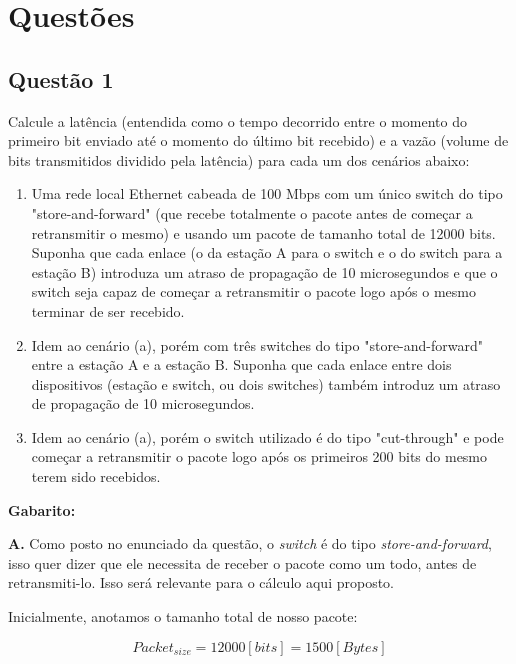 \section{Questões}\label{sec:questoes}


\subsection{Questão 1}

Calcule a latência (entendida como o tempo decorrido entre o momento do primeiro
bit enviado até o momento do último bit recebido) e a vazão (volume de bits
transmitidos dividido pela latência) para cada um dos cenários abaixo:

\begin{enumerate}
    \item Uma rede local Ethernet cabeada de 100 Mbps com um único switch do tipo
    "store-and-forward" (que recebe totalmente o pacote antes de começar a
    retransmitir o mesmo) e usando um pacote de tamanho total de 12000 bits. Suponha
    que cada enlace (o da estação A para o switch e o do switch para a estação B)
    introduza um atraso de propagação de 10 microsegundos e que o switch seja capaz
    de começar a retransmitir o pacote logo após o mesmo terminar de ser recebido.

    \item Idem ao cenário (a), porém com três switches do tipo "store-and-forward" entre
    a estação A e a estação B. Suponha que cada enlace entre dois dispositivos (estação
    e switch, ou dois switches) também introduz um atraso de propagação de 10
    microsegundos.

    \item Idem ao cenário (a), porém o switch utilizado é do tipo "cut-through" e pode
    começar a retransmitir o pacote logo após os primeiros 200 bits do mesmo terem sido
    recebidos.
\end{enumerate}

\textbf{Gabarito:}

\textbf{A. } Como posto no enunciado da questão, o \textit{switch} é do tipo \textit{store-and-forward}, isso quer dizer que ele necessita de receber o pacote como um todo, antes de retransmiti-lo. Isso será relevante para o cálculo aqui proposto.

Inicialmente, anotamos o tamanho total de nosso pacote:

\begin{equation}
	Packet_{size} = 12000 [bits] = 1500 [Bytes]
\end{equation}


